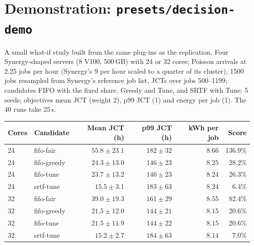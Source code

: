 \documentclass[11pt,a4paper]{article}
\newcommand{\code}[1]{\texttt{#1}}
\begin{document}
\section{Demonstration: \code{presets/decision-demo}}

A small what-if study built from the same plug-ins as the replication. Four Synergy-shaped servers (8 V100,
500\,GB) with 24 or 32 cores; Poisson arrivals at 2.25 jobs per hour (Synergy's 9 per hour scaled to a quarter of
its cluster), 1500 jobs resampled from Synergy's reference job list, JCTs over jobs 500--1199; candidates FIFO with
the fixed share, Greedy and Tune, and SRTF with Tune; 5 seeds; objectives mean JCT (weight 2), p99 JCT (1) and
energy per job (1). The 40 runs take 25\,s.

\begin{center}
\begin{tabular}{@{}llrrrr@{}}
\toprule
Cores & Candidate & Mean JCT (h) & p99 JCT (h) & kWh per job & Score \\
\midrule
24 & fifo-fair   & $55.8 \pm 23.1$ & $182 \pm 32$ & $8.66$ & 136.9\% \\
24 & fifo-greedy & $24.3 \pm 13.0$ & $146 \pm 23$ & $8.25$ & 28.2\% \\
24 & fifo-tune   & $23.7 \pm 13.2$ & $146 \pm 23$ & $8.24$ & 26.3\% \\
24 & srtf-tune   & $15.5 \pm 3.1$  & $183 \pm 63$ & $8.24$ & 6.4\% \\
\midrule
32 & fifo-fair   & $39.0 \pm 19.3$ & $161 \pm 29$ & $8.55$ & 82.4\% \\
32 & fifo-greedy & $21.5 \pm 12.0$ & $144 \pm 21$ & $8.15$ & 20.6\% \\
32 & fifo-tune   & $21.5 \pm 11.9$ & $144 \pm 22$ & $8.15$ & 20.6\% \\
32 & srtf-tune   & $15.2 \pm 2.7$  & $184 \pm 63$ & $8.14$ & 7.0\% \\
\bottomrule
\end{tabular}
\end{center}
\end{document}
